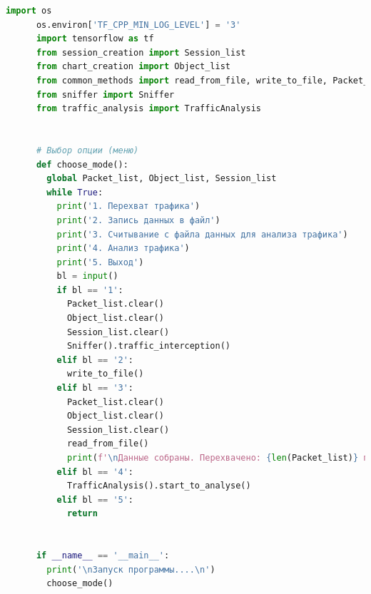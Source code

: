 \documentclass[bachelor, och, coursework]{SCWorks}
\begin{document}
    \begin{lstlisting}[language=Python]
      import os
      os.environ['TF_CPP_MIN_LOG_LEVEL'] = '3'
      import tensorflow as tf
      from session_creation import Session_list
      from chart_creation import Object_list
      from common_methods import read_from_file, write_to_file, Packet_list
      from sniffer import Sniffer
      from traffic_analysis import TrafficAnalysis
      
      
      # Выбор опции (меню)
      def choose_mode():
        global Packet_list, Object_list, Session_list
        while True:
          print('1. Перехват трафика')
          print('2. Запись данных в файл')
          print('3. Считывание с файла данных для анализа трафика')
          print('4. Анализ трафика')
          print('5. Выход')
          bl = input()
          if bl == '1':
            Packet_list.clear()
            Object_list.clear()
            Session_list.clear()
            Sniffer().traffic_interception()
          elif bl == '2':
            write_to_file()
          elif bl == '3':
            Packet_list.clear()
            Object_list.clear()
            Session_list.clear()
            read_from_file()
            print(f'\nДанные собраны. Перехвачено: {len(Packet_list)} пакетов(-а)\n')
          elif bl == '4':
            TrafficAnalysis().start_to_analyse()
          elif bl == '5':
            return
      
      
      if __name__ == '__main__':
        print('\nЗапуск программы....\n')
        choose_mode()
    \end{lstlisting}
\end{document}
